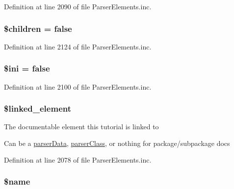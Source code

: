 \-Definition at line 2090 of file \-Parser\-Elements.\-inc.

\hypertarget{classparser_tutorial_aafda1a84fe840800c9884c167093f759}{
\subsubsection[{\$children}]{\setlength{\rightskip}{0pt plus 5cm}\$children = false}}\label{classparser_tutorial_aafda1a84fe840800c9884c167093f759}


\-Definition at line 2124 of file \-Parser\-Elements.\-inc.

\hypertarget{classparser_tutorial_a8f5f30fbe4092bf20ba2fcae8197ab09}{
\subsubsection[{\$ini}]{\setlength{\rightskip}{0pt plus 5cm}\$ini = false}}\label{classparser_tutorial_a8f5f30fbe4092bf20ba2fcae8197ab09}


\-Definition at line 2100 of file \-Parser\-Elements.\-inc.

\hypertarget{classparser_tutorial_a52a46f3839537187b0cc672002e6c228}{
\subsubsection[{\$linked\-\_\-element}]{\setlength{\rightskip}{0pt plus 5cm}\$linked\-\_\-element}}\label{classparser_tutorial_a52a46f3839537187b0cc672002e6c228}
\-The documentable element this tutorial is linked to

\-Can be a \hyperlink{classparser_data}{parser\-Data}, \hyperlink{classparser_class}{parser\-Class}, or nothing for package/subpackage docs 

\-Definition at line 2078 of file \-Parser\-Elements.\-inc.

\hypertarget{classparser_tutorial_ab2fc40d43824ea3e1ce5d86dee0d763b}{
\subsubsection[{\$name}]{\setlength{\rightskip}{0pt plus 5cm}\$name}}\label{classparser_tutorial_ab2fc40d43824ea3e1ce5d86dee0d763b}


